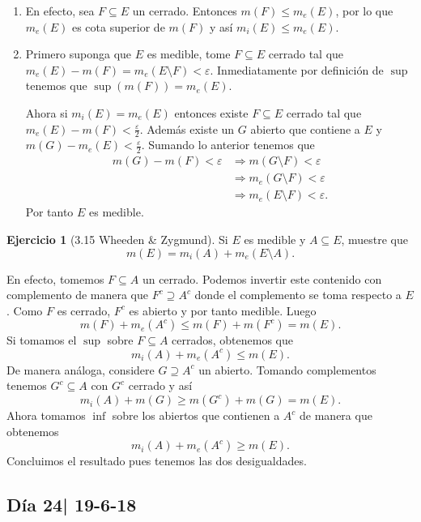 \documentclass[12pt]{article}
\theoremstyle{plain}
\theoremstyle{definition}
\newtheorem{Ej}[Th]{Ejercicio}
\theoremstyle{remark}
\numberwithin{equation}{section}
\renewcommand{\geq}{\geqslant}      %
\renewcommand{\leq}{\leqslant}      %
\renewcommand{\:}{\colon}           %
\begin{document}
\begin{multicols}{2}
\begin{ptcbp}
\begin{enumerate}
  \item En efecto, sea $F\subseteq E$ un cerrado. Entonces $m(F)\leq m_e(E)$, por lo que $m_e(E)$ es cota superior de $m(F)$ y así $m_i(E)\leq m_e(E)$.
  \item Primero suponga que $E$ es medible, tome $F\subseteq E$ cerrado tal que $m_e(E)-m(F)=m_e(E\setminus F)<\varepsilon$. Inmediatamente por definición de $\sup$ tenemos que $\sup(m(F))=m_e(E)$.\par
      Ahora si $m_i(E)=m_e(E)$ entonces existe $F\subseteq E$ cerrado tal que $m_e(E)-m(F)<\frac{\varepsilon}{2}$. Además existe un $G$ abierto que contiene a $E$ y $m(G)-m_e(E)<\frac{\varepsilon}{2}$. Sumando lo anterior tenemos que
      \begin{align*}
        m(G)-m(F)<\varepsilon &\Rightarrow m(G\setminus F)<\varepsilon\\
        &\Rightarrow m_e(G\setminus F)<\varepsilon\\
        &\Rightarrow m_e(E\setminus F)<\varepsilon.
      \end{align*}
      Por tanto $E$ es medible.
 \end{enumerate}
\end{ptcbp}

\begin{Ej}[3.15  Wheeden \& Zygmund]
 Si $E$ es medible y $A\subseteq E$, muestre que
 $$m(E)=m_i(A)+m_e(E\setminus A).$$
\end{Ej}

\begin{ptcbp}
En efecto, tomemos $F\subseteq A$ un cerrado. Podemos invertir este contenido con complemento de manera que $F^c\supseteq A^c$ donde el complemento se toma respecto a $E$. Como $F$ es cerrado, $F^c$ es abierto y por tanto medible. Luego
$$m(F)+m_e(A^c)\leq m(F)+m(F^c)=m(E).$$
Si tomamos el $\sup$ sobre $F\subseteq A$ cerrados, obtenemos que
$$m_i(A)+m_e(A^c)\leq m(E).$$
De manera análoga, considere $G\supseteq A^c$ un abierto. Tomando complementos tenemos $G^c\subseteq A$ con $G^c$ cerrado y así
$$m_i(A)+m(G)\geq m(G^c)+m(G)=m(E).$$
Ahora tomamos $\inf$ sobre los abiertos que contienen a $A^c$ de manera que obtenemos
$$m_i(A)+m_e(A^c)\geq m(E).$$
Concluimos el resultado pues tenemos las dos desigualdades.
\end{ptcbp}

\subsection{Día 24| 19-6-18}

\end{multicols}
\end{document}
